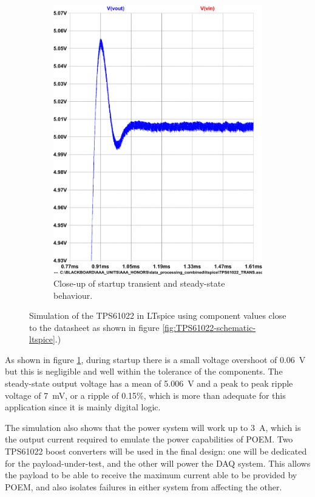 \documentclass[a4paper,11pt]{article}
\begin{document}
\begin{figure}[H]
\begin{subfigure}{.5\textwidth}
    \includegraphics[width=\linewidth]{images/TPS61022-simulation-plot-overshoot.pdf}
    \caption{Close-up of startup transient and steady-state behaviour.}
  \end{subfigure}
  \caption{Simulation of the TPS61022 in LTspice using component values close to the datasheet as shown in figure \ref{fig:TPS61022-schematic-ltspice}.)}
  \label{fig:TPS61022-simulation-ltspice}
\end{figure}

As shown in figure \ref{fig:TPS61022-simulation-ltspice}, during startup there is a small voltage overshoot of \SI{0.06}{\volt} but this is negligible and well within the tolerance of the components. The steady-state output voltage has a mean of \SI{5.006}{\volt} and a peak to peak ripple voltage of \SI{7}{\milli\volt}, or a ripple of 0.15\%, which is more than adequate for this application since it is mainly digital logic.

The simulation also shows that the power system will work up to \SI{3}{\ampere}, which is the output current required to emulate the power capabilities of POEM. Two TPS61022 boost converters will be used in the final design: one will be dedicated for the payload-under-test, and the other will power the DAQ system. This allows the payload to be able to receive the maximum current able to be provided by POEM, and also isolates failures in either system from affecting the other.
\end{document}
